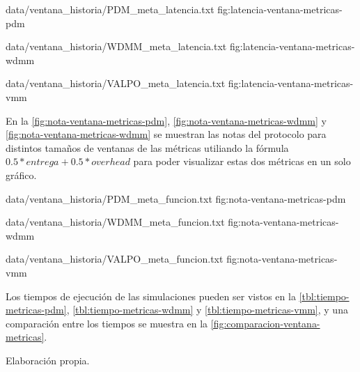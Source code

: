 {
{data/ventana_historia/PDM_meta_latencia.txt}
}{fig:latencia-ventana-metricas-pdm}

{
{data/ventana_historia/WDMM_meta_latencia.txt}
}{fig:latencia-ventana-metricas-wdmm}

{
{data/ventana_historia/VALPO_meta_latencia.txt}
}{fig:latencia-ventana-metricas-vmm}



En la \ref{fig:nota-ventana-metricas-pdm}, \ref{fig:nota-ventana-metricas-wdmm}
y \ref{fig:nota-ventana-metricas-wdmm} se muestran las notas del protocolo para
distintos tamaños de ventanas de las métricas utiliando la fórmula $0.5*entrega
+ 0.5*overhead$ para poder visualizar estas dos métricas en un solo gráfico.



{
{data/ventana_historia/PDM_meta_funcion.txt}
}{fig:nota-ventana-metricas-pdm}


{
{data/ventana_historia/WDMM_meta_funcion.txt}
}{fig:nota-ventana-metricas-wdmm}


{
{data/ventana_historia/VALPO_meta_funcion.txt}
}{fig:nota-ventana-metricas-vmm}



Los tiempos de ejecución de las simulaciones pueden ser vistos en la
\ref{tbl:tiempo-metricas-pdm}, \ref{tbl:tiempo-metricas-wdmm} y
\ref{tbl:tiempo-metricas-vmm}, y una comparación entre los tiempos se muestra en
la \ref{fig:comparacion-ventana-metricas}.


{Elaboración propia.}


